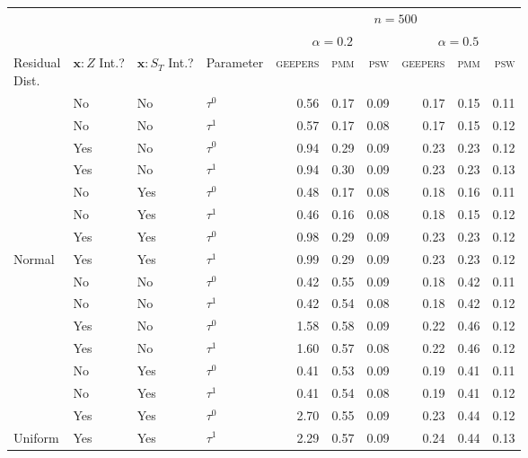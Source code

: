 
\begin{tabular}[t]{llllrrrrrr}
\toprule
\multicolumn{4}{c}{ } & \multicolumn{6}{c}{$n=500$} \\
\cmidrule(l{3pt}r{3pt}){5-10}
\multicolumn{4}{c}{ } & \multicolumn{3}{c}{$\alpha=0.2$} & \multicolumn{3}{c}{$\alpha=0.5$} \\
\cmidrule(l{3pt}r{3pt}){5-7} \cmidrule(l{3pt}r{3pt}){8-10}
\makecell[l]{Residual\\Dist.} & \makecell[l]{$\bm{x}:Z$\\Int.?} & \makecell[l]{$\bm{x}:S_T$\\Int.?} & Parameter & \textsc{geepers} & \textsc{pmm} & \textsc{psw} & \textsc{geepers} & \textsc{pmm} & \textsc{psw}\\
\midrule
 & No & No & $\tau^0$ & 0.56 & 0.17 & 0.09 & 0.17 & 0.15 & 0.11\\

 & No & No & $\tau^1$ & 0.57 & 0.17 & 0.08 & 0.17 & 0.15 & 0.12\\

 & Yes & No & $\tau^0$ & 0.94 & 0.29 & 0.09 & 0.23 & 0.23 & 0.12\\

 & Yes & No & $\tau^1$ & 0.94 & 0.30 & 0.09 & 0.23 & 0.23 & 0.13\\

 & No & Yes & $\tau^0$ & 0.48 & 0.17 & 0.08 & 0.18 & 0.16 & 0.11\\

 & No & Yes & $\tau^1$ & 0.46 & 0.16 & 0.08 & 0.18 & 0.15 & 0.12\\

 & Yes & Yes & $\tau^0$ & 0.98 & 0.29 & 0.09 & 0.23 & 0.23 & 0.12\\

\multirow{-8}{*}{\raggedright\arraybackslash Normal} & Yes & Yes & $\tau^1$ & 0.99 & 0.29 & 0.09 & 0.23 & 0.23 & 0.12\\
\cmidrule{1-10}
 & No & No & $\tau^0$ & 0.42 & 0.55 & 0.09 & 0.18 & 0.42 & 0.11\\

 & No & No & $\tau^1$ & 0.42 & 0.54 & 0.08 & 0.18 & 0.42 & 0.12\\

 & Yes & No & $\tau^0$ & 1.58 & 0.58 & 0.09 & 0.22 & 0.46 & 0.12\\

 & Yes & No & $\tau^1$ & 1.60 & 0.57 & 0.08 & 0.22 & 0.46 & 0.12\\

 & No & Yes & $\tau^0$ & 0.41 & 0.53 & 0.09 & 0.19 & 0.41 & 0.11\\

 & No & Yes & $\tau^1$ & 0.41 & 0.54 & 0.08 & 0.19 & 0.41 & 0.12\\

 & Yes & Yes & $\tau^0$ & 2.70 & 0.55 & 0.09 & 0.23 & 0.44 & 0.12\\

\multirow{-8}{*}{\raggedright\arraybackslash Uniform} & Yes & Yes & $\tau^1$ & 2.29 & 0.57 & 0.09 & 0.24 & 0.44 & 0.13\\
\bottomrule
\end{tabular}
